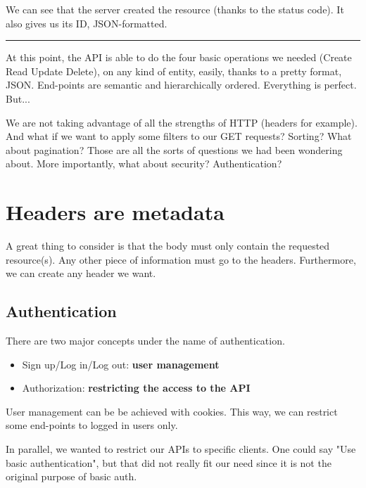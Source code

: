 We can see that the server created the resource (thanks to the status code). It also gives us its ID, JSON-formatted.

\bigskip

\begin{center}
\noindent\rule{10cm}{0.4pt}
\end{center}

\bigskip

At this point, the API is able to do the four basic operations we needed (Create Read Update Delete), on any kind of entity, easily, thanks to a pretty format, JSON. End-points are semantic and hierarchically ordered. Everything is perfect. But...

\medskip

We are not taking advantage of all the strengths of HTTP (headers for example). And what if we want to apply some filters to our GET requests? Sorting? What about pagination? Those are all the sorts of questions we had been wondering about. More importantly, what about security? Authentication?

\section{Headers are metadata}

A great thing to consider is that the body must only contain the requested resource(s). Any other piece of information must go to the headers. Furthermore, we can create any header we want.

\subsection{Authentication}

There are two major concepts under the name of authentication.

\begin{itemize}
  \item Sign up/Log in/Log out: \textbf{user management}
  \item Authorization: \textbf{restricting the access to the API}
\end{itemize}

User management can be be achieved with cookies. This way, we can restrict some end-points to logged in users only.

\medskip

In parallel, we wanted to restrict our APIs to specific clients. One could say "Use basic authentication", but that did not really fit our need since it is not the original purpose of basic auth.

